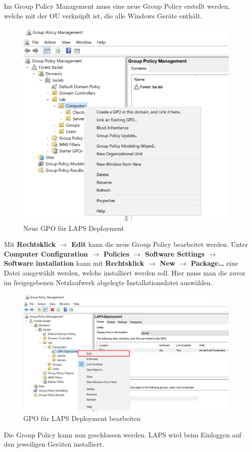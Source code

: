 Im Group Policy Management muss eine neue Group Policy erstellt werden, welche mit der OU verknüpft ist, die alle Windows Geräte enthält.
\begin{figure}[H]
    \centering
    \includegraphics[width=0.7\linewidth]{../img/LAPS/GPO-Create-New.png}
    \caption{Neue GPO für LAPS Deployment}
\end{figure}

Mit \textbf{Rechtsklick $\rightarrow$ Edit} kann die neue Group Policy bearbeitet werden.
    Unter \textbf{Computer Configuration $\rightarrow$ Policies $\rightarrow$ Software Settings $\rightarrow$ Software installation} kann mit \textbf{Rechtsklick $\rightarrow$ New $\rightarrow$ Package\dots} eine Datei ausgewählt werden, welche installiert werden soll.
    Hier muss man die zuvor im freigegebenen Netzlaufwerk abgelegte Installationsdatei auswählen.
    \begin{figure}[H]
        \centering
        \includegraphics[width=0.7\linewidth]{../img/LAPS/GPO-Edit-Deployment.png}
        \caption{GPO für LAPS Deployment bearbeiten}
    \end{figure}
 Die Group Policy kann nun geschlossen werden.
 LAPS wird beim Einloggen auf den jeweiligen Geräten installiert.


